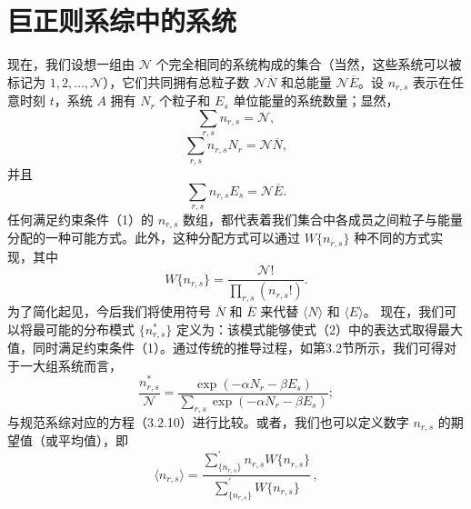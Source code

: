 \section{巨正则系综中的系统}\label{ux5927ux5747ux503cux96c6ux5408ux4e2dux7684ux7cfbux7edf}
现在，我们设想一组由 \(\mathcal{N}\) 个完全相同的系统构成的集合（当然，这些系统可以被标记为 \(1, 2, \ldots, \mathcal{N}\)），它们共同拥有总粒子数 \(\mathcal{N}\overline{N}\) 和总能量 \(\mathcal{N}\overline{E}\)。设 \(n_{r,s}\) 表示在任意时刻 \(t\)，系统 \(A\) 拥有 \(N_{r}\) 个粒子和 \(E_{s}\) 单位能量的系统数量；显然，
\begin{equation}\tag{4.2.1}\label{eq:4.2.1}
\sum _ { r , s } n _ { r , s } = \mathcal { N } ,
\end{equation}
\begin{equation}\tag{4.2.2}\label{eq:4.2.2}
\sum _ { r , s } n _ { r , s } N _ { r } = \mathcal { N } \overline { { N } } ,
\end{equation}
并且
\begin{equation}\tag{4.2.3}\label{eq:4.2.3}
\sum _ { r , s } n _ { r , s } E _ { s } = \mathcal { N } \overline { { E } } .
\end{equation}
任何满足约束条件（1）的 \(n_{r,s}\) 数组，都代表着我们集合中各成员之间粒子与能量分配的一种可能方式。此外，这种分配方式可以通过 \(W\{n_{r,s}\}\) 种不同的方式实现，其中
\begin{equation}\tag{4.2.4}\label{eq:4.2.4}
W \{ n _ { r , s } \} = \frac { \mathcal { N } ! } { \prod _ { r , s } ( n _ { r , s } ! ) } .
\end{equation}
为了简化起见，今后我们将使用符号 \(\overline{N}\) 和 \(\overline{E}\) 来代替 \(\langle N\rangle\) 和 \(\langle E\rangle\)。
现在，我们可以将最可能的分布模式 \(\{n_{r,s}^{*}\}\) 定义为：该模式能够使式（2）中的表达式取得最大值，同时满足约束条件（1）。通过传统的推导过程，如第3.2节所示，我们可得对于一大组系统而言，
\begin{equation}\tag{4.2.5}\label{eq:4.2.5}
\frac { n _ { r , s } ^{*} } { \mathcal { N } } = \frac { \exp { ( - \alpha N _ { r } - \beta E _ { s } ) } } { \sum _ { r , s } \exp { ( - \alpha N _ { r } - \beta E _ { s } ) } } ;
\end{equation}
与规范系综对应的方程（3.2.10）进行比较。或者，我们也可以定义数字 \(n_{r,s}\) 的期望值（或平均值），即
\begin{equation}\tag{4.2.6}\label{eq:4.2.6}
\langle n _ { r , s } \rangle = \frac { \sum _ { \{ n _ { r , s } \} } ^{\prime} n _ { r , s } W \{ n _ { r , s } \} } { \sum _ { \{ n _ { r , s } \} } ^{\prime} W \{ n _ { r , s } \} } \, ,
\end{equation}
